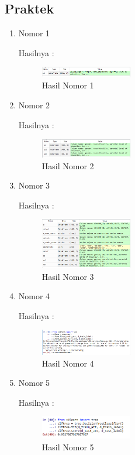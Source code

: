 \subsection{Praktek}
\begin{enumerate}
\item Nomor 1

Hasilnya :
\hfill\break
	\begin{figure}[H]
		\includegraphics[width=4cm]{figures/1174053/4/6.png}
		\centering
		\caption{Hasil Nomor 1}
	\end{figure}
	
\item Nomor 2
\hfill\break
	
Hasilnya :
\hfill\break
	\begin{figure}[H]
		\includegraphics[width=4cm]{figures/1174053/4/7.png}
		\centering
		\caption{Hasil Nomor 2}
	\end{figure}
	
\item Nomor 3
\hfill\break
	
Hasilnya :
\hfill\break
	\begin{figure}[H]
		\includegraphics[width=4cm]{figures/1174053/4/8.png}
		\centering
		\caption{Hasil Nomor 3}
	\end{figure}
	
\item Nomor 4
\hfill\break
	
Hasilnya :
\hfill\break
	\begin{figure}[H]
		\includegraphics[width=4cm]{figures/1174053/4/9.png}
		\centering
		\caption{Hasil Nomor 4}
	\end{figure}	

\item Nomor 5
\hfill\break
	
Hasilnya :
\hfill\break
	\begin{figure}[H]
		\includegraphics[width=4cm]{figures/1174053/4/10.png}
		\centering
		\caption{Hasil Nomor 5}
	\end{figure}
	

\end{enumerate}
